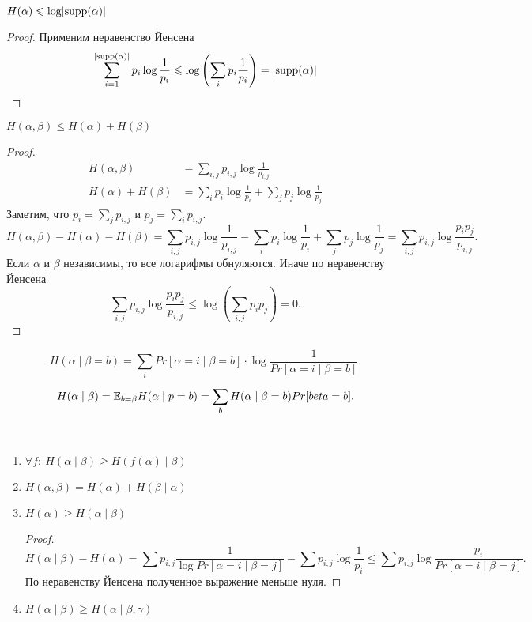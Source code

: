\begin{thm}
	$ H( \alpha ) \leqslant  \log \lvert \operatorname{supp} ( \alpha ) \rvert $
\end{thm}
\begin{proof}
	Применим неравенство Йенсена
	 \[
	\begin{aligned}
		\sum_{i = 1}^{\lvert \operatorname{supp} ( \alpha ) \rvert } p_i \log \frac{1}{p_i} \leqslant  \log \left( \sum_{i}^{} p_i \frac{1}{p_i} \right)  = \lvert \operatorname{supp} ( \alpha ) \rvert 
	\end{aligned}
	\]
\end{proof}
\begin{thm}
	$ H( \alpha , \beta ) \le H( \alpha ) + H ( \beta )$
\end{thm}
\begin{proof}
    \[
    \begin{aligned}
		H( \alpha , \beta ) &= \sum_{i, j}^{} p_{i, j} \log \frac{1}{p_{i, j}} \\
		H( \alpha ) + H( \beta ) &= \sum_{i}^{} p_i\log  \frac{1}{p_i} + \sum_{j}^{} p_j \log \frac{1}{p_j}
	\end{aligned}
	\]
	Заметим, что $ p_i = \sum_{j}^{} p_{i, j}$ и $ p_j = \sum_{i}^{} p_{i, j}$.
	\[
		H( \alpha , \beta ) -H( \alpha ) - H( \beta )= \sum_{i, j}^{} p_{i, j} \log \frac{1}{p_{i, j}}
		- \sum_{i}^{} p_i\log  \frac{1}{p_i} + \sum_{j}^{} p_j \log \frac{1}{p_j} = \sum_{i, j}^{ } p_{i, j} \log \frac{p_i p_j}{p_{i, j}}
	.\] 
	Если $  \alpha $ и $ \beta $ независимы, то все логарифмы обнуляются. Иначе по неравенству Йенсена
	\[
		\sum_{i, j}^{ } p_{i, j} \log \frac{p_i p_j}{p_{i, j}} \le  \log \left( \sum_{i, j}^{ } p_i p_j \right)  = 0
	.\] 
\end{proof}

\begin{defn}
	\[
	H( \alpha \mid \beta  = b) = \sum_{i}^{} Pr[ \alpha = i \mid  \beta  = b] \cdot  \log \frac{1}{Pr [ \alpha  = i \mid \beta  = b]}
.\]
\[
	H( \alpha  \mid \beta ) = \mathbb{E}_{b = \beta } H( \alpha  \mid p = b)  = \sum_{b}^{ } H ( \alpha  \mid \beta = b) Pr[beta = b]
.\] 
\end{defn}
\begin{prop}
    ~\begin{enumerate}
		\item $ \forall f \colon ~ H( \alpha  \mid \beta  ) \ge  H( f( \alpha ) \mid \beta )$
		\item $ H( \alpha , \beta ) = H( \alpha ) + H( \beta  \mid \alpha )$
		\item $ H( \alpha ) \ge  H ( \alpha \mid \beta )$
			\begin{proof}
			    \[
				H( \alpha \mid \beta ) - H ( \alpha ) = \sum_{ }^{ } p_{i, j} \frac{1}{\log Pr [ \alpha  = i \mid \beta  = j]} - \sum_{ }^{ } p_{i, j} \log \frac{1}{p_i} \le  \sum_{ }^{ } p_{i, j} \log \frac{p_i}{Pr [ \alpha = i \mid \beta  = j]} 
			    .\] 
				По неравенству Йенсена полученное выражение меньше нуля.
			\end{proof}
		\item $ H( \alpha \mid \beta) \ge H( \alpha  \mid \beta, \gamma ) $
    \end{enumerate} 
\end{prop}

